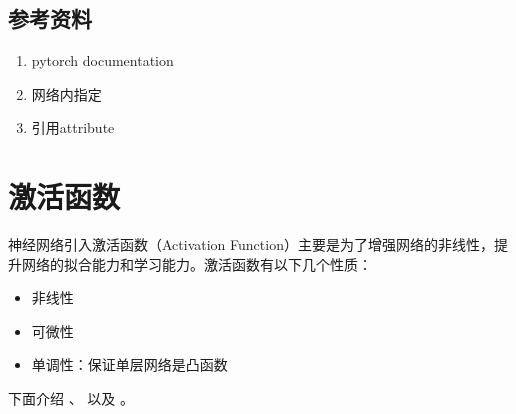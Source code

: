 \documentclass[letterpaper,10pt,english]{sphinxmanual}
\begin{document}
\subsection{参考资料}
\label{\detokenize{deepLearning/01_dataParallel:id3}}\begin{enumerate}
\item {} 
pytorch documentation

\end{enumerate}
\begin{quote}

\end{quote}
\begin{enumerate}
\setcounter{enumi}{1}
\item {} 
网络内指定

\end{enumerate}
\begin{quote}

\end{quote}
\begin{enumerate}
\setcounter{enumi}{2}
\item {} 
引用attribute

\end{enumerate}
\begin{quote}

\end{quote}


\section{激活函数}
\label{\detokenize{deepLearning/02_activationFunction::doc}}\label{\detokenize{deepLearning/02_activationFunction:id1}}
神经网络引入激活函数（Activation Function）主要是为了增强网络的非线性，提升网络的拟合能力和学习能力。激活函数有以下几个性质：
\begin{itemize}
\item {} 
非线性

\item {} 
可微性

\item {} 
单调性：保证单层网络是凸函数

\end{itemize}

下面介绍  、 以及  。
\end{document}
